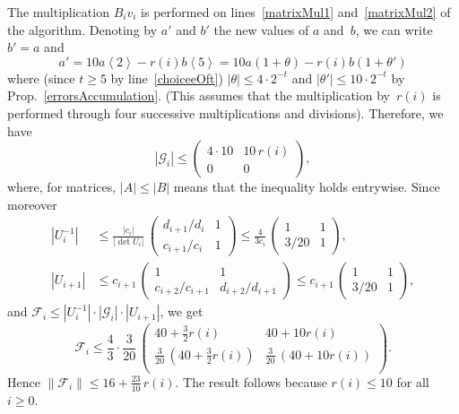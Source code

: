 \documentclass[10pt, conference]{IEEEtran}
\newcommand{\twork}{t}
\newcommand{\rnd}[1]{\left\langle #1 \right\rangle}
\renewcommand{\Phi}{\mathcal{F}}
\begin{document}
\begin{IEEEproof}
  The multiplication $B_i v_i$ is performed on lines~\ref{matrixMul1}
  and~\ref{matrixMul2} of the algorithm.
  Denoting by $a'$ and $b'$ the new values of $a$ and~$b$, we can write $b'=a$ and
  \[ a' = 10a\rnd{2} - r(i) b \rnd{5} = 10a(1+\theta) - r(i) b(1+\theta')\]
  where (since $t \geq 5$ by line~\ref{choiceeOft})
  $|\theta| \le 4\cdot 2^{-\twork}$
  and
  $|\theta'| \le 10\cdot 2^{-\twork}$
  by Prop.~\ref{errorsAccumulation}.
  (This assumes that the multiplication by~$r(i)$ is performed through four successive multiplications and divisions). Therefore, we have
\[
    |\mathcal{G}_i| \le
  \begin{pmatrix}
    4 \cdot 10 & 10\, r(i)\\
    0 & 0
  \end{pmatrix},
\]
where, for matrices, $|A| \le |B|$ means that the inequality holds entrywise. Since moreover
\begin{align*}
  |U_i^{-1}|
  &\le \frac{|c_i|}{|\det U_i|}\,
  \begin{pmatrix}
    d_{i+1}/d_i & 1\\
    c_{i+1}/c_i & 1
  \end{pmatrix} \le \frac{4}{3c_i}\,
  \begin{pmatrix}
    1 & 1\\
    3/20 & 1
  \end{pmatrix},
  \\
  |U_{i+1}|
  &\le c_{i+1}\,
  \begin{pmatrix}
    1 & 1\\
    c_{i+2}/c_{i+1} & d_{i+2}/d_{i+1}
  \end{pmatrix} \le c_{i+1}\,
  \begin{pmatrix}
    1 & 1\\
    3/20 & 1
  \end{pmatrix},
\end{align*}
and $\Phi_i \le |U_i^{-1}| \cdot |\mathcal{G}_i| \cdot |U_{i+1}|$, we get
\[ 
  \Phi_i \le \frac{4}{3}\cdot\frac{3}{20}\,
  \begin{pmatrix}
    40+\frac{3}{2}r(i) & 40+10r(i)\\
    \frac{3}{20}\,(40+\frac{3}{2}r(i)) & \frac{3}{20}\,(40+10r(i))\\
  \end{pmatrix}.
  \]
  Hence $\|\Phi_i\| \le 16 + \frac{23}{10}\,r(i)$. The
result follows because $r(i) \le 10$ for all $i \geq 0$.
\end{IEEEproof}
\end{document}
